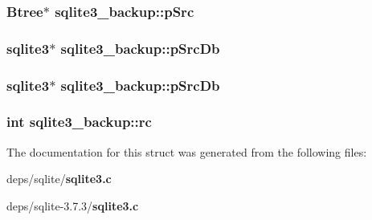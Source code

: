 \subsubsection{\setlength{\rightskip}{0pt plus 5cm}\bf{Btree}$\ast$ \bf{sqlite3\_\-backup::p\-Src}}\label{structsqlite3__backup_e0df32630108600371f31b10a2851308}


\subsubsection{\setlength{\rightskip}{0pt plus 5cm}\bf{sqlite3}$\ast$ \bf{sqlite3\_\-backup::p\-Src\-Db}}\label{structsqlite3__backup_a9531af0fe37cfa6c3a509f058000479}


\subsubsection{\setlength{\rightskip}{0pt plus 5cm}\bf{sqlite3}$\ast$ \bf{sqlite3\_\-backup::p\-Src\-Db}}\label{structsqlite3__backup_a9531af0fe37cfa6c3a509f058000479}


\subsubsection{\setlength{\rightskip}{0pt plus 5cm}int \bf{sqlite3\_\-backup::rc}}\label{structsqlite3__backup_b97d3ba57367e1c3c983d8b0912e6829}




The documentation for this struct was generated from the following files:\begin{CompactItemize}
\item 
deps/sqlite/\bf{sqlite3.c}\item 
deps/sqlite-3.7.3/\bf{sqlite3.c}\end{CompactItemize}
